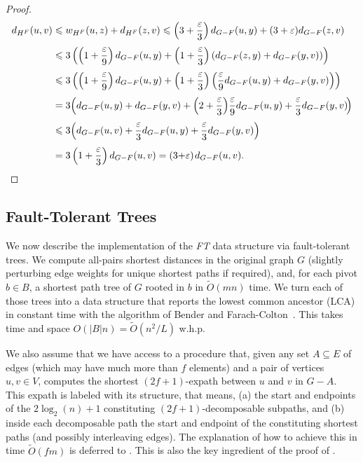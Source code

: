 \documentclass{theoretics}
\newcommand*{\Otilde}{\widetilde{O}}
\newcommand*{\nwspace}{\hspace*{.1em}}
\renewcommand{\le}{\leqslant}
\newcommand{\eps}{\varepsilon}
\begin{document}
\begin{proof}
 \begin{align*}
    d_{H^F}(u,v) &\le w_{H^F}(u,z) + d_{H^F}(z,v)
      \le \left(3+\frac{\eps}{3}\right)  d_{G-F}(u,y)
        + (3+\eps)  d_{G-F}(z,v)\\[.33em]
      &\le 3 \left(\left(1+\frac{\eps}{9}\right) d_{G-F}(u,y)
        + \left(1+\frac{\eps}{3} \right) \left(d_{G-F}(z,y) + d_{G-F}(y,v) \right) \right)\\[.33em]
      &\le 3 \left(\left(1+\frac{\eps}{9}\right) d_{G-F}(u,y)
        + \left(1+\frac{\eps}{3} \right) \left( \frac{\eps}{9}  d_{G-F}(u,y) 
          + d_{G-F}(y,v) \right) \right)\\[.33em]
      &= 3 \Big( d_{G-F}(u,y) + d_{G-F}(y,v) 
        + \left(2+\frac{\eps}{3} \right) \!\frac{\eps}{9}  d_{G-F}(u,y) 
        + \frac{\eps}{3}  d_{G-F}(y,v) \!\Big)\\[.33em]
      &\le  3 \Big(d_{G-F}(u,v) + \frac{\eps}{3}  d_{G-F}(u,y) 
        + \frac{\eps}{3}  d_{G-F}(y,v) \Big)\\[.33em]
      &= 3 \left(1+\frac{\eps}{3} \right)  d_{G-F}(u,v)
       = (3 {+} \eps) \nwspace d_{G-F}(u,v). \qedhere
  \end{align*}
\end{proof}


\subsection{Fault-Tolerant Trees}
\label{subsec:sublinear_FT-trees}

We now describe the implementation of the \emph{FT} data structure
via fault-tolerant trees.
We compute all-pairs shortest distances in the original graph $G$ 
(slightly perturbing edge weights for unique shortest paths if required),
and, for each pivot $b \in B$, a shortest path tree of $G$ rooted in $b$
in $\Otilde(mn)$ time.
We turn each of those trees into a data structure that reports
the lowest common ancestor (LCA) in constant time
with the algorithm of Bender and Farach-Colton~\cite{BenderFarachColton00LCARevisited}.
This takes time and space $O(|B|n) = \Otilde(n^2/L)$ w.h.p.

We also assume that we have access to a procedure
that, given any set $A \subseteq E$ of edges 
(which may have much more than $f$ elements) and a pair of vertices $u,v \in V$,
computes the shortest $(2f{+}1)$-expath between $u$ and $v$
in $G{-}A$.
This expath is labeled with its structure,
that means, (a) the start and endpoints of the $2\log_2(n)+1$
constituting $(2f{+}1)$-decomposable subpaths,
and (b) inside each decomposable path the start and endpoint of the constituting shortest paths
(and possibly interleaving edges). 
The explanation of how to achieve this in time $\Otilde(fm)$ is deferred to .
This is also the key ingredient of the proof of .
\end{document}
